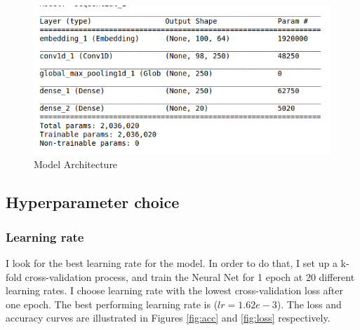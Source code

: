 \documentclass[journal,12pt,onecolumn]{IEEEtran}
\begin{document}
\begin{figure}[h]
    \centering
    \includegraphics[width=0.5\linewidth]{model.png}
    \caption{Model Architecture}
    \label{fig:model}
\end{figure}


\subsection{Hyperparameter choice}
\subsubsection{Learning rate} I look for the best learning rate for the model. In order to do that, I set up a k-fold cross-validation process, and train the Neural Net for 1 epoch at 20 different learning rates. I choose learning rate with the lowest cross-validation loss after one epoch. The best performing learning rate is ($lr=1.62e-3$). The loss and accuracy curves are illustrated in Figures \ref{fig:acc} and \ref{fig:loss} respectively.
\end{document}
